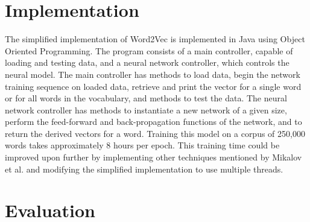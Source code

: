 \documentclass{article}
\begin{document}
\section{Implementation}

The simplified implementation of Word2Vec is implemented in Java using Object Oriented Programming. The program consists of a main controller, capable of loading and testing data, and a neural network controller, which controls the neural model. The main controller has methods to load data, begin the network training sequence on loaded data, retrieve and print the vector for a single word or for all words in the vocabulary, and methods to test the data. The neural network controller has methods to instantiate a new network of a given size, perform the feed-forward and back-propagation functions of the network, and to return the derived vectors for a word. Training this model on a corpus of 250,000 words takes approximately 8 hours per epoch. This training time could be improved upon further by implementing other techniques mentioned by Mikalov et al. and modifying the simplified implementation to use multiple threads. 


\section{Evaluation}
\end{document}
